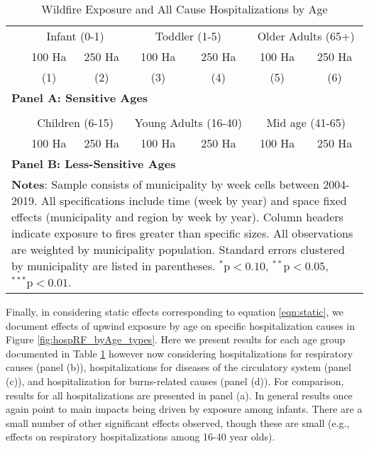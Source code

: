 \documentclass[11pt]{article}
\begin{document}
\begin{spacing}{1.5}
\begin{table}[ht!]
    \caption{Wildfire Exposure and All Cause Hospitalizations by Age}
    \label{tab:RFhospAge}
    \centering
    \begin{tabular}{lcccccc} \\ \toprule
    & \multicolumn{2}{c}{Infant (0-1)}  & \multicolumn{2}{c}{Toddler (1-5)} & \multicolumn{2}{c}{Older Adults (65+)}
    \\ \cmidrule(r){2-3}\cmidrule(r){4-5}\cmidrule(r){6-7}
    & 100 Ha & 250 Ha & 100 Ha & 250 Ha & 100 Ha & 250 Ha\\ 
    & (1) & (2) & (3) & (4) & (5) & (6) \\ \midrule
    \multicolumn{7}{l}{\textbf{Panel A: Sensitive Ages}}\\
     
    \midrule \\
    & \multicolumn{2}{c}{Children (6-15)}  & \multicolumn{2}{c}{Young Adults (16-40)} & \multicolumn{2}{c}{Mid age (41-65)} \\ 
    \cmidrule(r){2-3}\cmidrule(r){4-5}\cmidrule(r){6-7}
    & 100 Ha & 250 Ha & 100 Ha & 250 Ha & 100 Ha & 250 Ha\\ 
    \midrule
    \multicolumn{7}{l}{\textbf{Panel B: Less-Sensitive Ages}}\\
     
    \bottomrule
    \multicolumn{7}{p{15.4cm}}{{\footnotesize \textbf{Notes}: Sample consists of municipality by week cells between 2004-2019.  All specifications include time (week by year) and space fixed effects (municipality and region by week by year).  Column headers indicate exposure to fires greater than specific sizes.  All observations are weighted by municipality population.  Standard errors clustered by municipality are listed in parentheses.   $^{*}\text{p}<0.10$, $^{**}\text{p}<0.05$, $^{***}\text{p}<0.01$.}}
    \end{tabular}
\end{table}

Finally, in considering static effects corresponding to equation \ref{eqn:static}, we document effects of upwind exposure by age on specific hospitalization causes in Figure \ref{fig:hospRF_byAge_types}.  Here we present results for each age group documented in Table \ref{tab:RFhospAge} however now considering hospitalizations for respiratory causes (panel (b)), hospitalizations for diseases of the circulatory system (panel (c)), and hospitalization for burns-related causes (panel (d)).  For comparison, results for all hospitalizations are presented in panel (a).  In general results once again point to main impacts being driven by exposure among infants.  There are a small number of other significant effects observed, though these are small (e.g., effects on respiratory hospitalizations among 16-40 year olds).



\end{spacing}
\end{document}
